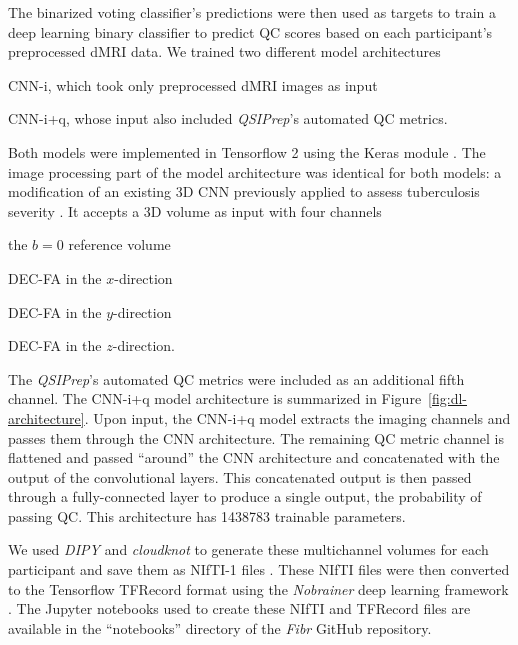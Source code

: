 \documentclass[9pt,lineno]{elife}
\begin{document}
The binarized voting classifier's predictions were then used as targets to train a deep
learning binary classifier to predict QC scores based on each participant's preprocessed
dMRI data. We trained two different model architectures
\begin{enumerate*}[%
    label=(\roman*),%
    before=\unskip{: },%
    itemjoin={{, }},%
    itemjoin*={{ and }}]
    \item CNN-i, which took only preprocessed dMRI images as input
    \item CNN-i+q, whose input also included \emph{QSIPrep}'s automated QC metrics.
\end{enumerate*}
Both models were implemented in Tensorflow 2 \citep{tensorflow} using the Keras
module \citep{keras}. The image processing part of the model architecture was
identical for both models: a modification of an existing 3D CNN
\citep{zunair2020-bs} previously applied to assess tuberculosis severity
\citep{dicente2019clef}. It accepts a 3D volume as input with four channels
\begin{enumerate*}[%
    label=(\roman*),%
    before=\unskip{: },%
    itemjoin={{, }},%
    itemjoin*={{ and }}]
    \item the $b=0$ reference volume
    \item DEC-FA in the $x$-direction
    \item DEC-FA in the $y$-direction
    \item DEC-FA in the $z$-direction.
\end{enumerate*}
The \emph{QSIPrep}'s automated QC metrics were included as an additional fifth
channel. The CNN-i+q model architecture is summarized in
Figure~\ref{fig:dl-architecture}. Upon input, the CNN-i+q model extracts the
imaging channels and passes them through the CNN architecture. The remaining QC
metric channel is flattened and passed ``around'' the CNN architecture and
concatenated with the output of the convolutional layers. This concatenated
output is then passed through a fully-connected layer to produce a single
output, the probability of passing QC. This architecture has \num{1438783} trainable
parameters.

We used \emph{DIPY} \citep{dipy} and \emph{cloudknot} \citep{cloudknot} to
generate these multichannel volumes for each participant and save them as NIfTI-1
files \citep{nifti}. These NIfTI files were then converted to the Tensorflow
TFRecord format using the \emph{Nobrainer} deep learning framework
\citep{nobrainer}. The Jupyter notebooks used to create these NIfTI and TFRecord
files are available in the ``notebooks'' directory of the \emph{Fibr} GitHub
repository.
\end{document}
